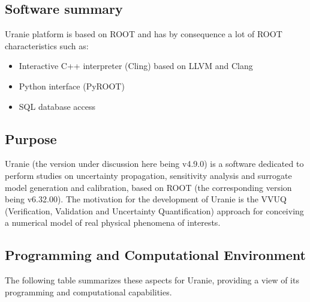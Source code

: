 \subsection{Software summary}
\label{sec:Uranie:summary}

Uranie platform is based on ROOT and has by consequence a lot of ROOT characteristics such as:
\begin{itemize}
    \item Interactive C++ interpreter (Cling) based on LLVM and Clang 
    \item Python interface (PyROOT)
    \item SQL database access 
\end{itemize}


\subsection{Purpose}
\label{sec:Uranie:purpose}

Uranie (the version under discussion here being v4.9.0) is a software dedicated to perform studies on uncertainty propagation, sensitivity analysis and surrogate model generation and calibration, based on ROOT (the corresponding version being v6.32.00). The motivation for the development of Uranie is the VVUQ (Verification, Validation and Uncertainty Quantification) approach for conceiving a numerical model of real physical phenomena of interests.

\subsection{Programming and Computational Environment}
\label{sec::Uranie:environment_capabilities}


The following table summarizes these aspects for Uranie, providing a  view of its programming and computational capabilities.

